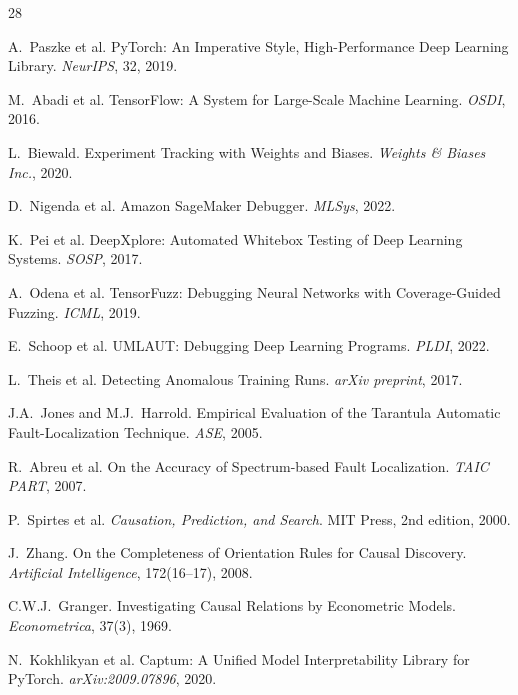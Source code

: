 \documentclass[11pt]{article}
\begin{document}

\begin{thebibliography}{28}

A.~Paszke et al.
\newblock PyTorch: An Imperative Style, High-Performance Deep Learning Library.
\newblock \emph{NeurIPS}, 32, 2019.

M.~Abadi et al.
\newblock TensorFlow: A System for Large-Scale Machine Learning.
\newblock \emph{OSDI}, 2016.

L.~Biewald.
\newblock Experiment Tracking with Weights and Biases.
\newblock \emph{Weights \& Biases Inc.}, 2020.

D.~Nigenda et al.
\newblock Amazon SageMaker Debugger.
\newblock \emph{MLSys}, 2022.

K.~Pei et al.
\newblock DeepXplore: Automated Whitebox Testing of Deep Learning Systems.
\newblock \emph{SOSP}, 2017.

A.~Odena et al.
\newblock TensorFuzz: Debugging Neural Networks with Coverage-Guided Fuzzing.
\newblock \emph{ICML}, 2019.

E.~Schoop et al.
\newblock UMLAUT: Debugging Deep Learning Programs.
\newblock \emph{PLDI}, 2022.

L.~Theis et al.
\newblock Detecting Anomalous Training Runs.
\newblock \emph{arXiv preprint}, 2017.

J.A.~Jones and M.J.~Harrold.
\newblock Empirical Evaluation of the Tarantula Automatic Fault-Localization Technique.
\newblock \emph{ASE}, 2005.

R.~Abreu et al.
\newblock On the Accuracy of Spectrum-based Fault Localization.
\newblock \emph{TAIC PART}, 2007.

P.~Spirtes et al.
\newblock \emph{Causation, Prediction, and Search}.
\newblock MIT Press, 2nd edition, 2000.

J.~Zhang.
\newblock On the Completeness of Orientation Rules for Causal Discovery.
\newblock \emph{Artificial Intelligence}, 172(16--17), 2008.

C.W.J.~Granger.
\newblock Investigating Causal Relations by Econometric Models.
\newblock \emph{Econometrica}, 37(3), 1969.

N.~Kokhlikyan et al.
\newblock Captum: A Unified Model Interpretability Library for PyTorch.
\newblock \emph{arXiv:2009.07896}, 2020.


\end{thebibliography}
\end{document}
